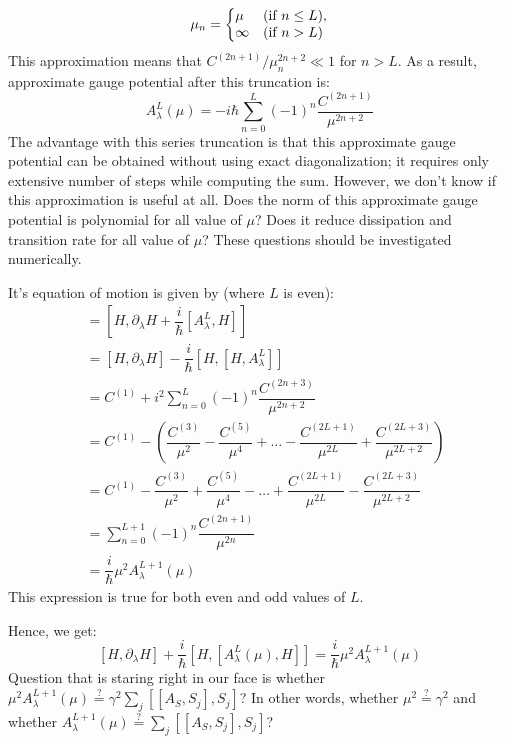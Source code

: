 \documentclass[11pt,a4paper]{article}
\begin{document}
\begin{equation}
  \mu_n=\left\{
  \begin{array}{@{}ll@{}}
   \mu & (\mbox{if } n \leq L), \\
   \infty & (\mbox{if } n > L)
  \end{array}\right.
\end{equation}
This approximation means that $C^{(2n+1)}/\mu^{2n+2}_n \ll 1 $ for $n> L$. As a result, approximate gauge potential after this truncation is: 
\begin{equation}
 A_{\lambda}^{L}(\mu) =  -i\hbar \sum_{n=0}^{L}   (-1)^{n} \dfrac{ C^{(2n+1)}}{\mu^{2n+2}}
\end{equation}
The advantage with this series truncation is that this approximate gauge potential can be obtained without using exact diagonalization; it requires only extensive number of steps while computing the sum. However, we don't know if this approximation is useful at all. Does the norm of this approximate gauge potential is polynomial for all value of $\mu$? Does it reduce dissipation and transition rate for all value of $\mu$? These questions should be investigated numerically.

It's equation of motion is given by (where $L$ is even):
\begin{align*}
[H, G_{\lambda}(\mu)^L]&=[H, \partial_{\lambda} H + \dfrac{i}{\hbar} [A_{\lambda}^L, H]] \\
&= [H, \partial_{\lambda} H] - \dfrac{i}{\hbar} [H,[ H, A_{\lambda}^L]]\\
&= C^{(1)} + i^2    \sum_{n=0}^{L}   (-1)^{n} \dfrac{ C^{(2n+3)}}{\mu^{2n+2}}\\
&= C^{(1)} -  (   \dfrac{ C^{(3)}}{\mu^{2}} - \dfrac{ C^{(5)}}{\mu^{4}} + \ldots - \dfrac{ C^{(2L+1)}}{\mu^{2L}}+ \dfrac{ C^{(2L+3)}}{\mu^{2L+2}} )\\
&= C^{(1)} -   \dfrac{ C^{(3)}}{\mu^{2}} + \dfrac{ C^{(5)}}{\mu^{4}} - \ldots  + \dfrac{ C^{(2L+1)}}{\mu^{2L}} - \dfrac{ C^{(2L+3)}}{\mu^{2L+2}}\\
&=\sum_{n=0}^{L+1}   (-1)^{n} \dfrac{ C^{(2n+1)}}{\mu^{2n}}\\
&= \dfrac{i}{\hbar} \mu^2 A_{\lambda}^{L+1} (\mu)
\end{align*}
This expression is true for both even and odd values of $L$.

Hence, we get:
 \begin{equation}
 \boxed{[H, \partial_{\lambda} H] + \dfrac{i}{\hbar}[H, [A_{\lambda}^{L} (\mu), H]]= \dfrac{i}{\hbar} \mu^2 A_{\lambda}^{L+1} (\mu)}
 \end{equation}
Question that is staring right in our face is whether $ \mu^2 A_{\lambda}^{L+1} (\mu)\stackrel{?}{=} \gamma^2 \sum_j  [[A_{S}, S_j], S_j ]$? In other  words, whether $\mu^2 \stackrel{?}{=} \gamma^2 $ and whether $ A_{\lambda}^{L+1} (\mu)\stackrel{?}{=} \sum_j  [[A_{S}, S_j], S_j ]$? 
\end{document}
